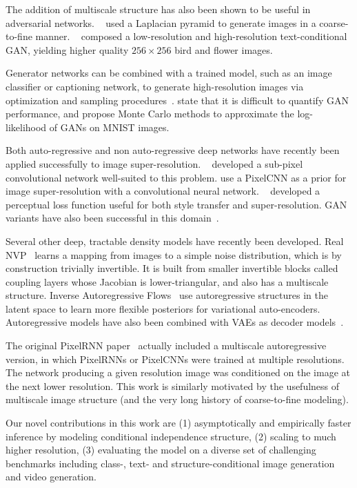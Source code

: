 \documentclass{article}
\begin{document}
The addition of multiscale structure has also been shown to be useful in adversarial networks.
~\citet{denton2015deep} used a Laplacian pyramid to generate images in a coarse-to-fine manner.
~\citet{zhang2016stackgan} composed a low-resolution and high-resolution text-conditional GAN, yielding higher quality $256\times 256$ bird and flower images. 


Generator networks can be combined with a trained model, such as an image classifier or captioning network, to generate high-resolution images via optimization and sampling procedures~\cite{nguyen2016plug}.
\citet{Wu2017on} state that it is difficult to quantify GAN performance, and propose Monte Carlo methods to approximate the log-likelihood of GANs on MNIST images. 



Both auto-regressive and non auto-regressive deep networks have recently been applied successfully to image super-resolution.
~\citet{shi2016real} developed a sub-pixel convolutional network well-suited to this problem.
\citet{dahl2017pixel} use a PixelCNN as a prior for image super-resolution with a convolutional neural network.
~\citet{johnson2016perceptual} developed a perceptual loss function useful for both style transfer and super-resolution.
GAN variants have also been successful in this domain~\cite{Ledig2016arxiv,sonderby2016amortised}.


Several other deep, tractable density models have recently been developed.
Real NVP~\citep{dinh2016density} learns a mapping from images to a simple noise distribution, which is by construction trivially invertible.
It is built from smaller invertible blocks called coupling layers whose Jacobian is lower-triangular, and also has a multiscale structure.
Inverse Autoregressive Flows~\citep{kingma2016improving} use autoregressive structures in the latent space to learn more flexible posteriors for variational auto-encoders.
Autoregressive models have also been combined with VAEs as decoder models~\citep{gulrajani2016pixelvae}.

The original PixelRNN paper~\citep{Oord2016pixelRNN} actually included a multiscale autoregressive version, in which
PixelRNNs or PixelCNNs were trained at multiple resolutions.
The network producing a given resolution image was conditioned on the image at the next lower resolution.
This work is similarly motivated by the usefulness of multiscale image structure (and the very long history of coarse-to-fine modeling).


Our novel contributions in this work are (1) asymptotically and empirically faster inference by modeling conditional independence structure, (2) scaling to much higher resolution, (3) evaluating the model on a diverse set of challenging benchmarks including class-, text- and structure-conditional image generation and video generation. 
\end{document}

